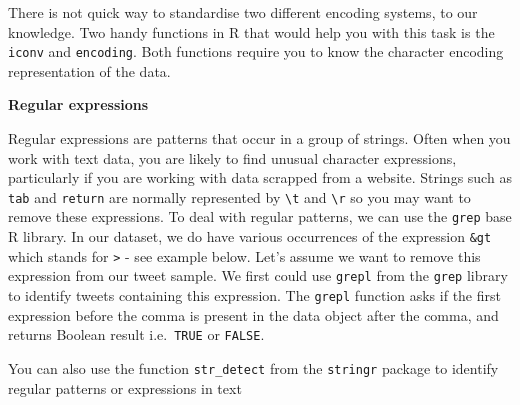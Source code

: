 \documentclass[
  letterpaper,
  DIV=11,
  numbers=noendperiod]{scrreprt}
\newenvironment{Shaded}{\begin{snugshade}}{\end{snugshade}}
\newcommand{\DecValTok}[1]{\textcolor[rgb]{0.68,0.00,0.00}{#1}}
\newcommand{\FunctionTok}[1]{\textcolor[rgb]{0.28,0.35,0.67}{#1}}
\newcommand{\NormalTok}[1]{\textcolor[rgb]{0.00,0.23,0.31}{#1}}
\newcommand{\SpecialCharTok}[1]{\textcolor[rgb]{0.37,0.37,0.37}{#1}}
\newcommand{\StringTok}[1]{\textcolor[rgb]{0.13,0.47,0.30}{#1}}
\begin{document}
There is not quick way to standardise two different encoding systems, to
our knowledge. Two handy functions in R that would help you with this
task is the \texttt{iconv} and \texttt{encoding}. Both functions require
you to know the character encoding representation of the data.

\textbf{Regular expressions}

Regular expressions are patterns that occur in a group of strings. Often
when you work with text data, you are likely to find unusual character
expressions, particularly if you are working with data scrapped from a
website. Strings such as \texttt{tab} and \texttt{return} are normally
represented by \texttt{\textbackslash{}t} and \texttt{\textbackslash{}r}
so you may want to remove these expressions. To deal with regular
patterns, we can use the \texttt{grep} base R library. In our dataset,
we do have various occurrences of the expression \texttt{\&gt} which
stands for \texttt{\textgreater{}} - see example below. Let's assume we
want to remove this expression from our tweet sample. We first could use
\texttt{grepl} from the \texttt{grep} library to identify tweets
containing this expression. The \texttt{grepl} function asks if the
first expression before the comma is present in the data object after
the comma, and returns Boolean result i.e.~\texttt{TRUE} or
\texttt{FALSE}.

\begin{tcolorbox}[enhanced jigsaw, arc=.35mm, opacityback=0, leftrule=.75mm, bottomrule=.15mm, titlerule=0mm, opacitybacktitle=0.6, left=2mm, colframe=quarto-callout-note-color-frame, rightrule=.15mm, colback=white, bottomtitle=1mm, toprule=.15mm, breakable, title=\textcolor{quarto-callout-note-color}{\faInfo}\hspace{0.5em}{Note}, toptitle=1mm, coltitle=black, colbacktitle=quarto-callout-note-color!10!white]

You can also use the function \texttt{str\_detect} from the
\texttt{stringr} package to identify regular patterns or expressions in
text

\end{tcolorbox}

\begin{Shaded}
\end{Shaded}
\end{document}

